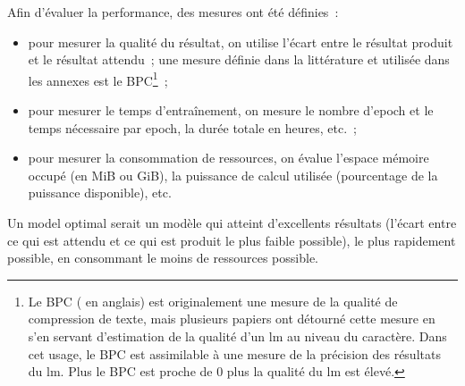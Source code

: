 Afin d'évaluer la performance, des mesures ont été définies~:
\begin{itemize}
	\item pour mesurer la qualité du résultat, on utilise l'écart entre le résultat produit et le résultat attendu~; une mesure définie dans la littérature et utilisée dans les annexes est le BPC\footnote{Le BPC ( en anglais) \autocite{BPC} est originalement une mesure de la qualité de compression de texte, mais plusieurs papiers ont détourné cette mesure en s'en servant d'estimation de la qualité d'un \gls{lm} au niveau du caractère. Dans cet usage, le BPC est assimilable à une mesure de la précision des résultats du \gls{lm}. Plus le BPC est proche de 0 plus la qualité du \gls{lm} est élevé.}~;
	\item pour mesurer le temps d'entraînement, on mesure le nombre d'\gls{epoch} et le temps nécessaire par \gls{epoch}, la durée totale en heures, etc.~;
	\item pour mesurer la consommation de ressources, on évalue l'espace mémoire occupé (en MiB ou GiB), la puissance de calcul utilisée (pourcentage de la puissance disponible), etc.
\end{itemize}
\vspace{1em}

Un \gls{model} optimal serait un modèle qui atteint d'excellents résultats  (l'écart entre ce qui est attendu et ce qui est produit le plus faible possible), le plus rapidement possible, en consommant le moins de ressources possible.

